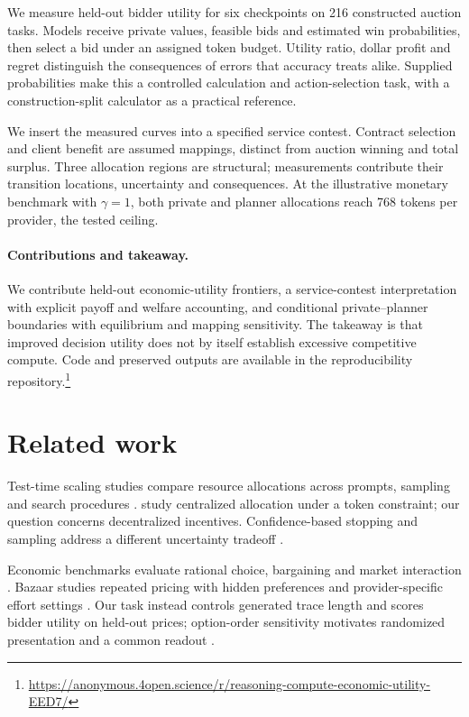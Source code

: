 \documentclass{article}
\begin{document}
We measure held-out bidder utility for six checkpoints on 216 constructed auction tasks. Models receive private values, feasible bids and estimated win probabilities, then select a bid under an assigned token budget. Utility ratio, dollar profit and regret distinguish the consequences of errors that accuracy treats alike. Supplied probabilities make this a controlled calculation and action-selection task, with a construction-split calculator as a practical reference.

We insert the measured curves into a specified service contest. Contract selection and client benefit are assumed mappings, distinct from auction winning and total surplus. Three allocation regions are structural; measurements contribute their transition locations, uncertainty and consequences. At the illustrative monetary benchmark with $\gamma=1$, both private and planner allocations reach 768 tokens per provider, the tested ceiling.

\paragraph{Contributions and takeaway.}
We contribute held-out economic-utility frontiers, a service-contest interpretation with explicit payoff and welfare accounting, and conditional private--planner boundaries with equilibrium and mapping sensitivity. The takeaway is that improved decision utility does not by itself establish excessive competitive compute. Code and preserved outputs are available in the reproducibility repository.\footnote{\url{https://anonymous.4open.science/r/reasoning-compute-economic-utility-EED7/}}

\section{Related work}

Test-time scaling studies compare resource allocations across prompts, sampling and search procedures \citep{wei2022chain,snell2024scaling,wu2024inference,alomrani2025budget,hariri2026scaling}. \citet{wan2026shadowprice} study centralized allocation under a token constraint; our question concerns decentralized incentives. Confidence-based stopping and sampling address a different uncertainty tradeoff \citep{jurayj2025finalanswer,shi2025reasoninguncertainty,xie2026statistical}.

Economic benchmarks evaluate rational choice, bargaining and market interaction \citep{raman2024steer,raman2025steerme,fish2025econevals,chen2024aucarena,zhu2024synthetic,deng2024bargaining}. Bazaar studies repeated pricing with hidden preferences and provider-specific effort settings \citep{ahmed2026bazaar}. Our task instead controls generated trace length and scores bidder utility on held-out prices; option-order sensitivity motivates randomized presentation and a common readout \citep{pezeshkpour2024order}.
\end{document}
